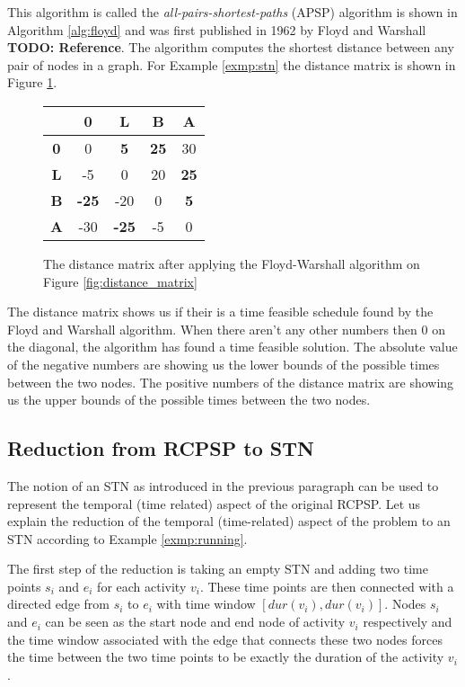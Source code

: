 \documentclass{article}
\theoremstyle{definition}
\newcommand{\TODO}[1]{{\color{red}\textbf{TODO: #1}}}
\newcommand{\dur}[1]{\ensuremath{dur(v_{#1})}} %
\begin{document}
This algorithm is called the \emph{all-pairs-shortest-paths} (APSP) algorithm is shown in Algorithm \ref{alg:floyd} and was first published in 1962 by Floyd and Warshall \TODO{Reference}.
The algorithm computes the shortest distance between any pair of nodes in a graph.
For Example \ref{exmp:stn} the distance matrix is shown in Figure \ref{fig:stn_dist_matrix}.

\begin{figure}[h]
	\centering
	\begin{tabular}{ c | c c c c }
	  			& \textbf{0}		& \textbf{L} 		& \textbf{B} 		& \textbf{A} \\ \hline
	  \textbf{0} 	& 0 				& \textbf{5}		& \textbf{25} 	& 30 \\
	  \textbf{L} 	& -5 			& 0				& 20			& \textbf{25} \\
	  \textbf{B} 	& \textbf{-25}	& -20			& 0				& \textbf{5} \\
	  \textbf{A} 	& -30			& \textbf{-25}	& -5 			& 0 \\
	\end{tabular}
	\caption{The distance matrix after applying the Floyd-Warshall algorithm on Figure \ref{fig:distance_matrix}}
	\label{fig:stn_dist_matrix}
\end{figure}

The distance matrix shows us if their is a time feasible schedule found by the Floyd and Warshall algorithm.
When there aren't any other numbers then $0$ on the diagonal, the algorithm has found a time feasible solution.
The absolute value of the negative numbers are showing us the lower bounds of the possible times between the two nodes.
The positive numbers of the distance matrix are showing us the upper bounds of the possible times between the two nodes.

\subsection{Reduction from RCPSP to STN}
The notion of an STN as introduced in the previous paragraph can be used to represent the temporal (time related) aspect of the original RCPSP. Let us explain the reduction of the temporal (time-related) aspect of the problem to an STN according to Example \ref{exmp:running}.

The first step of the reduction is taking an empty STN and adding two time points $s_i$ and $e_i$ for each activity $v_i$. 
These time points are then connected with a directed edge from $s_i$ to $e_i$ with time window $[\dur{i}, \dur{i}]$. 
Nodes $s_i$ and $e_i$ can be seen as the start node and end node of activity $v_i$ respectively and the time window associated with the edge that connects these two nodes forces the time between the two time points to be exactly the duration of the activity $v_i$.
\end{document}
